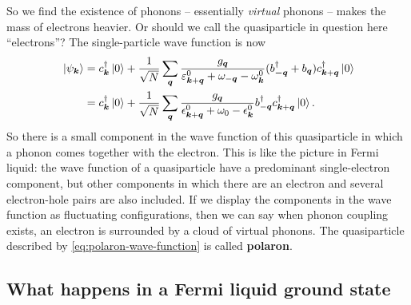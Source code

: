 \documentclass[hyperref, a4paper]{article}
\newcommand*{\concept}[1]{{\textbf{#1}}}
\begin{document}
So we find the existence of phonons -- essentially \emph{virtual} phonons -- 
makes the mass of electrons heavier.
Or should we call the quasiparticle in question here ``electrons''?
The single-particle wave function is now 
\begin{equation}
    \begin{aligned}
        \ket*{\psi_{\vb*{k}}} &= c^\dagger_{\vb*{k}} \ket*{0}
        + \frac{1}{\sqrt{N}} \sum_{\vb*{q}} \frac{g_{\vb*{q}}}{\varepsilon^0_{\vb*{k} + \vb*{q}} + \omega_{-\vb*{q}} - \omega^0_{\vb*{k}}} (b^\dagger_{\vb*{-q}} + b_{\vb*{q}}) c^\dagger_{\vb*{k} + \vb*{q}} \ket*{0} \\
        &= c^\dagger_{\vb*{k}} \ket*{0}
        + \frac{1}{\sqrt{N}} \sum_{\vb*{q}} \frac{g_{\vb*{q}}}{\epsilon^0_{\vb*{k} + \vb*{q}} + \omega_0 - \epsilon^0_{\vb*{k}}} b^\dagger_{- \vb*{q}} c^\dagger_{\vb*{k} + \vb*{q}} \ket*{0}.
    \end{aligned}
    \label{eq:polaron-wave-function}
\end{equation}
So there is a small component in the wave function of this quasiparticle 
in which a phonon comes together with the electron.
This is like the picture in Fermi liquid:
the wave function of a quasiparticle 
have a predominant single-electron component, 
but other components in which there are an electron and several electron-hole pairs 
are also included.
If we display the components in the wave function as fluctuating configurations, 
then we can say when phonon coupling exists, 
an electron is surrounded by a cloud of virtual phonons.
The quasiparticle described by \eqref{eq:polaron-wave-function} is called \concept{polaron}.

\subsection{What happens in a Fermi liquid ground state}
\end{document}
